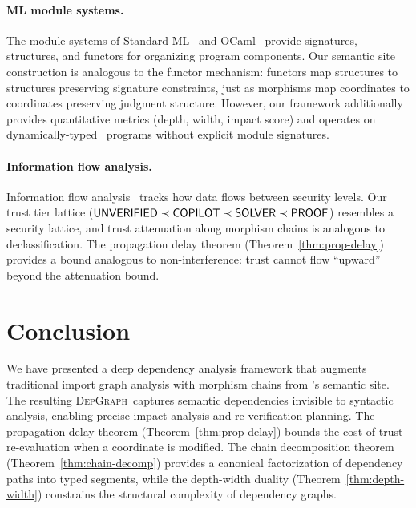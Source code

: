 \documentclass[11pt]{article}
\newcommand{\DepGraph}{\textsc{DepGraph}}
\begin{document}
\paragraph{ML module systems.}
The module systems of Standard ML~\cite{MacQueen1984} and
OCaml~\cite{Leroy2000} provide signatures, structures, and functors for
organizing program components.  Our semantic site construction is analogous
to the functor mechanism: functors map structures to structures preserving
signature constraints, just as morphisms map coordinates to coordinates
preserving judgment structure.  However, our framework additionally provides
quantitative metrics (depth, width, impact score) and operates on
dynamically-typed \Python\ programs without explicit module signatures.

\paragraph{Information flow analysis.}
Information flow analysis~\cite{Denning1976,Sabelfeld2003} tracks how data
flows between security levels.  Our trust tier lattice
($\mathsf{UNVERIFIED} \prec \mathsf{COPILOT} \prec \mathsf{SOLVER} \prec \mathsf{PROOF}$) resembles a
security lattice, and trust attenuation along morphism chains is analogous
to declassification.  The propagation delay theorem
(Theorem~\ref{thm:prop-delay}) provides a bound analogous to
non-interference: trust cannot flow ``upward'' beyond the attenuation
bound.

\section{Conclusion}\label{sec:conclusion}

We have presented a deep dependency analysis framework that augments
traditional import graph analysis with morphism chains from \JuGeo's
semantic site.  The resulting \DepGraph\ captures semantic dependencies
invisible to syntactic analysis, enabling precise impact analysis and
re-verification planning.  The propagation delay theorem
(Theorem~\ref{thm:prop-delay}) bounds the cost of trust re-evaluation when
a coordinate is modified.  The chain decomposition theorem
(Theorem~\ref{thm:chain-decomp}) provides a canonical factorization of
dependency paths into typed segments, while the depth-width duality
(Theorem~\ref{thm:depth-width}) constrains the structural complexity of
dependency graphs.
\end{document}
